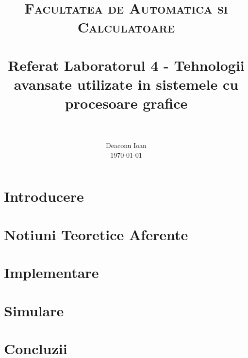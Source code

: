\documentclass[paper=a4, fontsize=11pt]{scrartcl}
\title{
		\usefont{OT1}{bch}{b}{n}
		\normalfont \normalsize \textsc{Facultatea de Automatica si Calculatoare} \\ [25pt]
		\horrule{0.5pt} \\[0.4cm]
		\huge Referat Laboratorul 4 - Tehnologii avansate utilizate in sistemele cu procesoare
        grafice \\
		\horrule{2pt} \\[0.5cm]
}
\author{
		\normalfont 								\normalsize
        Deaconu Ioan\\[-3pt]		\normalsize
        \today
}
\date{}
\numberwithin{equation}{section}		%
\numberwithin{figure}{section}			%
\numberwithin{table}{section}				%
\begin{document}
 
\maketitle

\section{Introducere}
\label{sec:introducere}


\section{Notiuni Teoretice Aferente}
\label{sec:notiuniteoretice}


\section{Implementare}
\label{sec:implementare}


\section{Simulare} 
\label{sec:simulare}


\section{Concluzii} 
\label{sec:concluzii}




\end{document}
